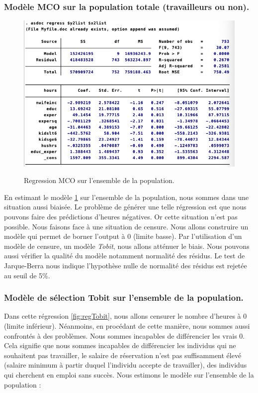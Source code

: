 \subsubsection{Modèle MCO sur la population totale (travailleurs ou non).}

\begin{figure}[h]
    \caption{Regression MCO sur l'ensemble de la population.}
    \includegraphics[scale = 0.8]{100_tab_results/MCOensemblepopu.png}
    \centering
    \label{reg:RegressionMCOpopu}
\end{figure}


En estimant le modèle \ref{reg:RegressionMCOpopu} sur l’ensemble de la population, nous sommes dans une situation aussi biaisée. Le problème de générer une telle régression est que nous pouvons faire des prédictions d’heures négatives. Or cette situation n’est pas possible. Nous faisons face à une situation de censure. Nous allons construire un modèle qui permet de borner l’output à 0 (limite basse). Par l’utilisation d’un modèle de censure, un modèle \emph{Tobit}, nous allons atténuer le biais. 
Nous pouvons aussi vérifier la qualité du modèle notamment normalité des résidus. Le test de Jarque-Berra nous indique l’hypothèse nulle de normalité des résidus est rejetée au seuil de 5\%.


\subsubsection{Modèle de sélection Tobit sur l'ensemble de la population.}

Dans cette régression \ref{fig:regTobit}, nous allons censurer le nombre d’heures à 0 (limite inférieur). Néanmoins, en procédant de cette manière, nous sommes aussi confrontés à des problèmes. Nous sommes incapables de différencier les vrais 0. Cela signifie que nous sommes incapables de différencier les individus qui ne souhaitent pas travailler, le salaire de réservation n’est pas suffisamment élevé (salaire minimum à partir duquel l’individu accepte de travailler), des individus qui cherchent en emploi sans succès. Nous estimons le modèle sur l'ensemble de la population : 

